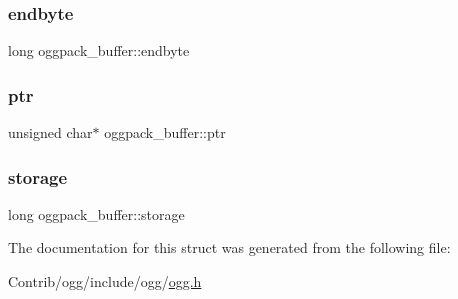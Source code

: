 \mbox{\label{structoggpack__buffer_a416200dd77da3603dce3913826d74207}} 
\subsubsection{\texorpdfstring{endbyte}{endbyte}}
{\footnotesize\ttfamily long oggpack\+\_\+buffer\+::endbyte}

\mbox{\label{structoggpack__buffer_a479984d9646e0fba6da8aff21e5c3b64}} 
\subsubsection{\texorpdfstring{ptr}{ptr}}
{\footnotesize\ttfamily unsigned char$\ast$ oggpack\+\_\+buffer\+::ptr}

\mbox{\label{structoggpack__buffer_a1eea2afb662c8080a902d224773fee4e}} 
\subsubsection{\texorpdfstring{storage}{storage}}
{\footnotesize\ttfamily long oggpack\+\_\+buffer\+::storage}



The documentation for this struct was generated from the following file\+:\begin{DoxyCompactItemize}
\item 
Contrib/ogg/include/ogg/\mbox{\hyperlink{ogg_8h}{ogg.\+h}}\end{DoxyCompactItemize}
